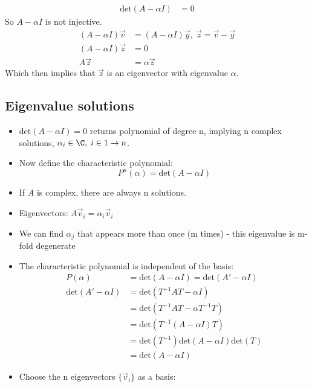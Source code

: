 \documentclass[cplx.tex]{subfiles}
\begin{document}
\begin{align}
    \text{det}(A - \alpha I) &= 0 
\end{align}
So $A - \alpha I$ is not injective. 
\begin{align}
    (A - \alpha I)\vec{v} &= (A - \alpha I)\vec{y}, ~\vec{z} = \vec{v}-\vec{y} \\
    (A - \alpha I)\vec{z} &= 0 \\
    A\vec{z} &= \alpha\vec{z}
\end{align}
Which then implies that $\vec{z}$ is an eigenvector with eigenvalue $\alpha$.

\subsection{Eigenvalue solutions}
\begin{itemize}
    \item $\text{det}(A-\alpha I) = 0$ returns polynomial of degree n, implying n complex solutions, $\alpha_i \in \C,\; i \in 1 \to n$. 
    \item Now define the characteristic polynomial:
        \begin{equation}
            P^n(\alpha) = \text{det}(A-\alpha I)
        \end{equation}
    \item If $A$ is complex, there are always n solutions. 
    \item Eigenvectors: $A\vec{v}_i = \alpha_i\vec{v}_i$
    \item We can find $\alpha_j$ that appears more than once (m times) - this eigenvalue is m-fold degenerate
    \item The characteristic polynomial is independent of the basis:
        \begin{align}
            P(\alpha) &= \text{det}(A-\alpha I) = \text{det}(A'-\alpha I) \\
            \text{det}(A'-\alpha I) &= \text{det}(T^{-1}AT-\alpha I) \\
                                    &= \text{det}(T^{-1}AT - \alpha T^{-1}T) \\
                                    &= \text{det}(T^{-1}(A-\alpha I)T) \\
                                    &= \text{det}(T^{-1})\text{det}(A-\alpha I)\text{det}(T) \\
                                    &= \text{det}(A - \alpha I)
        \end{align}
    \item Choose the n eigenvectors $\{\vec{v}_i\}$ as a basis:

\end{itemize}
\end{document}
